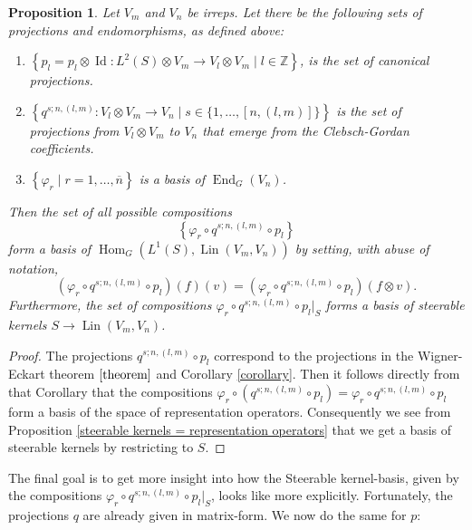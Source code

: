 \documentclass[12pt, a4paper]{article}
\theoremstyle{plain}
\newtheorem{pro}{Proposition}[section]
\theoremstyle{definition}
\theoremstyle{remark}
\newcommand{\Z}{\mathds{Z}}
\DeclareMathOperator{\lin}{Lin}
\DeclareMathOperator{\End}{End}
\DeclareMathOperator{\Hom}{Hom}
\DeclareMathOperator{\Id}{Id}
\begin{document}
\begin{pro}\label{representation operators basis}
Let $V_m$ and $V_n$ be irreps. Let there be the following sets of projections and endomorphisms, as defined above:
\begin{enumerate}
\item $\left\lbrace p_l = p_l \otimes \Id: L^2(S) \otimes V_m \to V_l \otimes V_m \mid l \in \Z \right\rbrace$, is the set of canonical projections.
\item $\left\lbrace q^{s;n,(l,m)}: V_l \otimes V_m \to V_n \mid s \in \{1, \dots, [n,(l,m)]\} \right\rbrace$ is the set of projections from $V_l \otimes V_m$ to $V_n$ that emerge from the Clebsch-Gordan coefficients.
\item $\left\lbrace \varphi_r \mid r = 1, \dots, \overline{n} \right\rbrace$ is a basis of $\End_G(V_n)$.
\end{enumerate}
Then the set of all possible compositions 
\begin{equation*}
\left\lbrace \varphi_r \circ q^{s;n,(l,m)} \circ p_l \right\rbrace
\end{equation*} 
form a basis of $\Hom_G(L^1(S), \lin(V_m, V_n))$ by setting, with abuse of notation, 
\begin{equation*}
(\varphi_r \circ q^{s;n,(l,m)} \circ p_l)(f)(v) = (\varphi_r \circ q^{s;n,(l,m)} \circ p_l)(f \otimes v).
\end{equation*}
Furthermore, the set of compositions $\varphi_r \circ q^{s;n,(l,m)} \circ p_l|_{S}$ forms a basis of steerable kernels $S \to \lin(V_m, V_n)$.
\end{pro}

\begin{proof}
The projections $q^{s;n,(l,m)} \circ p_l$ correspond to the projections in the Wigner-Eckart theorem $\ref{theorem}$ and Corollary \ref{corollary}. Then it follows directly from that Corollary that the compositions $\varphi_r \circ (q^{s;n,(l,m)} \circ p_l) = \varphi_r \circ q^{s;n,(l,m)} \circ p_l$ form a basis of the space of representation operators. Consequently we see from Proposition \ref{steerable kernels = representation operators} that we get a basis of steerable kernels by restricting to $S$.
\end{proof}

The final goal is to get more insight into how the Steerable kernel-basis, given by the compositions $\varphi_r \circ q^{s;n,(l,m)} \circ p_l|_S$, looks like more explicitly. Fortunately, the projections $q$ are already given in matrix-form. We now do the same for $p$:
\end{document}
